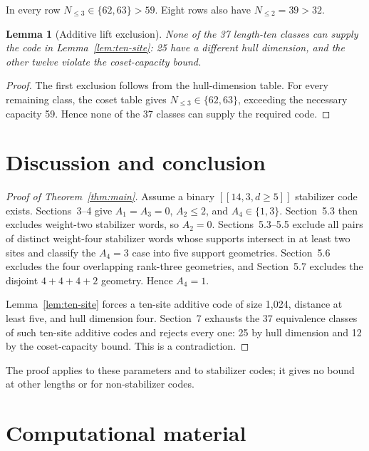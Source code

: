 \documentclass[11pt]{article}
\newtheorem{lemma}[theorem]{Lemma}
\begin{document}
In every row \(N_{\leq3}\in\{62,63\}>59\). Eight rows also have \(N_{\leq2}=39>32\).

\begin{lemma}[Additive lift exclusion]\label{lem:additive-lift}
None of the 37 length-ten classes can supply the code in Lemma~\ref{lem:ten-site}: 25 have a different hull dimension, and the other twelve violate the coset-capacity bound.
\end{lemma}
\begin{proof}
The first exclusion follows from the hull-dimension table. For every remaining class, the coset table gives \(N_{\leq3}\in\{62,63\}\), exceeding the necessary capacity 59. Hence none of the 37 classes can supply the required code.
\end{proof}

\section{Discussion and conclusion}\label{discussion-and-conclusion}

\begin{proof}[Proof of Theorem~\ref{thm:main}]
Assume a binary \(\left[\!\left[14,3,d\ge 5\right]\!\right]\) stabilizer code exists. Sections~3--4 give \(A_{1}=A_{3}=0\), \(A_{2}\leq2\), and \(A_{4}\in\{1,3\}\). Section~5.3 then excludes weight-two stabilizer words, so \(A_{2}=0\). Sections~5.3--5.5 exclude all pairs of distinct weight-four stabilizer words whose supports intersect in at least two sites and classify the \(A_4=3\) case into five support geometries. Section~5.6 excludes the four overlapping rank-three geometries, and Section~5.7 excludes the disjoint \(4+4+4+2\) geometry. Hence \(A_{4}=1\).

Lemma~\ref{lem:ten-site} forces a ten-site additive code of size 1,024, distance at least five, and hull dimension four. Section~7 exhausts the 37 equivalence classes of such ten-site additive codes and rejects every one: 25 by hull dimension and 12 by the coset-capacity bound. This is a contradiction.
\end{proof}

The proof applies to these parameters and to stabilizer codes; it gives no bound at other lengths or for non-stabilizer codes.

\section{Computational material}\label{computational-material}
\end{document}

